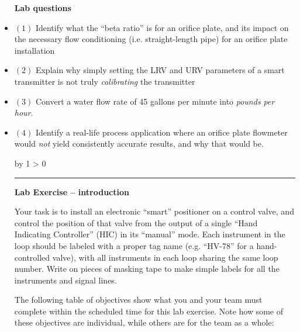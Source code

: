 \documentclass[12pt,a4paper]{article}
\def\oppgave{
            \advance\questnum by 1
            \ifnum \questnum > 0
                 \hrule
                 \vskip 3pt
                 \leftline{Oppgave \the\questnum}
                 \vskip 3pt \fi}
\begin{document}
\begin{itemize}
\vfil \eject

\noindent
{\bf Lab questions}

\vskip 20pt

\item{$(1)$} Identify what the ``beta ratio'' is for an orifice plate, and its impact on the necessary flow conditioning (i.e. straight-length pipe) for an orifice plate installation

\vskip 20pt

\item{$(2)$} Explain why simply setting the LRV and URV parameters of a smart transmitter is not truly {\it calibrating} the transmitter

\vskip 20pt

\item{$(3)$} Convert a water flow rate of 45 gallons per minute into {\it pounds per hour}.

\vskip 20pt

\item{$(4)$} Identify a real-life process application where an orifice plate flowmeter would {\it not} yield consistently accurate results, and why that would be.
 



\vfil \eject 




\oppgave{} 

\noindent
{\bf Lab Exercise -- introduction}

\vskip 5pt

Your task is to install an electronic ``smart'' positioner on a control valve, and control the position of that valve from the output of a single ``Hand Indicating Controller'' (HIC) in its ``manual'' mode.  Each instrument in the loop should be labeled with a proper tag name (e.g. ``HV-78'' for a hand-controlled valve), with all instruments in each loop sharing the same loop number.  Write on pieces of masking tape to make simple labels for all the instruments and signal lines.

The following table of objectives show what you and your team must complete within the scheduled time for this lab exercise.  Note how some of these objectives are individual, while others are for the team as a whole:


\end{itemize}
\end{document}
